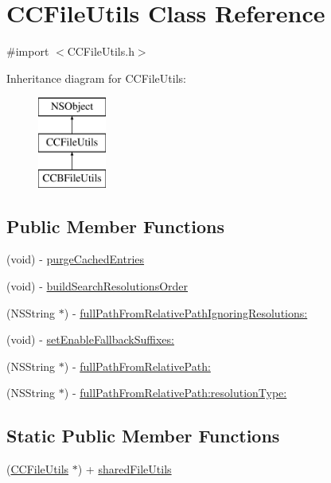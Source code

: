 \hypertarget{class_c_c_file_utils}{\section{C\-C\-File\-Utils Class Reference}
\label{class_c_c_file_utils}
}


{\ttfamily \#import $<$C\-C\-File\-Utils.\-h$>$}

Inheritance diagram for C\-C\-File\-Utils\-:\begin{figure}[H]
\begin{center}
\leavevmode
\includegraphics[height=3.000000cm]{class_c_c_file_utils}
\end{center}
\end{figure}
\subsection*{Public Member Functions}
\begin{DoxyCompactItemize}
\item 
(void) -\/ \hyperlink{class_c_c_file_utils_afab26800906352ab0c9809d46cbdcc90}{purge\-Cached\-Entries}
\item 
(void) -\/ \hyperlink{class_c_c_file_utils_a3641c60426c06150254907f5ea325c3d}{build\-Search\-Resolutions\-Order}
\item 
(N\-S\-String $\ast$) -\/ \hyperlink{class_c_c_file_utils_aa204a78ef4b39cbf04389e5f1fa4da75}{full\-Path\-From\-Relative\-Path\-Ignoring\-Resolutions\-:}
\item 
(void) -\/ \hyperlink{class_c_c_file_utils_ae56e2fe41377b63334d0ccc67ba90537}{set\-Enable\-Fallback\-Suffixes\-:}
\item 
(N\-S\-String $\ast$) -\/ \hyperlink{class_c_c_file_utils_a270b676e357a8440376ef0883992c43c}{full\-Path\-From\-Relative\-Path\-:}
\item 
(N\-S\-String $\ast$) -\/ \hyperlink{class_c_c_file_utils_a5c694b767ebf131e1a01d145cdbd1811}{full\-Path\-From\-Relative\-Path\-:resolution\-Type\-:}
\end{DoxyCompactItemize}
\subsection*{Static Public Member Functions}
\begin{DoxyCompactItemize}
\item 
(\hyperlink{class_c_c_file_utils}{C\-C\-File\-Utils} $\ast$) + \hyperlink{class_c_c_file_utils_a22778340e63b61d0a5e1977b741b256b}{shared\-File\-Utils}
\end{DoxyCompactItemize}
